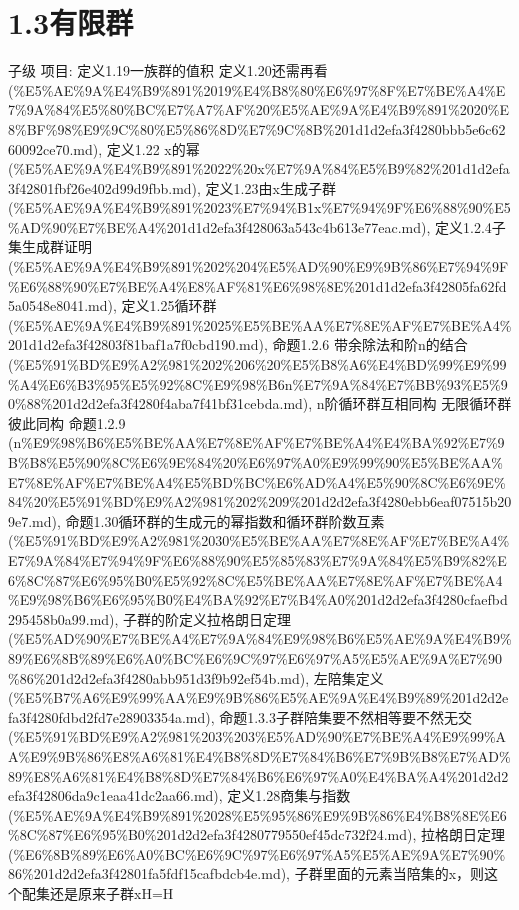 \section*{1.3有限群}

\begin{note}[1.3有限群]

子级 项目: 定义1.19一族群的值积 定义1.20还需再看 (\%E5\%AE\%9A\%E4\%B9\%891\%2019\%E4\%B8\%80\%E6\%97\%8F\%E7\%BE\%A4\%E7\%9A\%84\%E5\%80\%BC\%E7\%A7\%AF\%20\%E5\%AE\%9A\%E4\%B9\%891\%2020\%E8\%BF\%98\%E9\%9C\%80\%E5\%86\%8D\%E7\%9C\%8B\%201d1d2efa3f4280bbb5e6c6260092ce70.md), 定义1.22 x的幂 (\%E5\%AE\%9A\%E4\%B9\%891\%2022\%20x\%E7\%9A\%84\%E5\%B9\%82\%201d1d2efa3f42801fbf26e402d99d9fbb.md), 定义1.23由x生成子群 (\%E5\%AE\%9A\%E4\%B9\%891\%2023\%E7\%94\%B1x\%E7\%94\%9F\%E6\%88\%90\%E5\%AD\%90\%E7\%BE\%A4\%201d1d2efa3f428063a543c4b613e77eac.md), 定义1.2.4子集生成群证明 (\%E5\%AE\%9A\%E4\%B9\%891\%202\%204\%E5\%AD\%90\%E9\%9B\%86\%E7\%94\%9F\%E6\%88\%90\%E7\%BE\%A4\%E8\%AF\%81\%E6\%98\%8E\%201d1d2efa3f42805fa62fd5a0548e8041.md), 定义1.25循环群 (\%E5\%AE\%9A\%E4\%B9\%891\%2025\%E5\%BE\%AA\%E7\%8E\%AF\%E7\%BE\%A4\%201d1d2efa3f42803f81baf1a7f0cbd190.md), 命题1.2.6 带余除法和阶n的结合 (\%E5\%91\%BD\%E9\%A2\%981\%202\%206\%20\%E5\%B8\%A6\%E4\%BD\%99\%E9\%99\%A4\%E6\%B3\%95\%E5\%92\%8C\%E9\%98\%B6n\%E7\%9A\%84\%E7\%BB\%93\%E5\%90\%88\%201d2d2efa3f4280f4aba7f41bf31cebda.md), n阶循环群互相同构 无限循环群彼此同构 命题1.2.9 (n\%E9\%98\%B6\%E5\%BE\%AA\%E7\%8E\%AF\%E7\%BE\%A4\%E4\%BA\%92\%E7\%9B\%B8\%E5\%90\%8C\%E6\%9E\%84\%20\%E6\%97\%A0\%E9\%99\%90\%E5\%BE\%AA\%E7\%8E\%AF\%E7\%BE\%A4\%E5\%BD\%BC\%E6\%AD\%A4\%E5\%90\%8C\%E6\%9E\%84\%20\%E5\%91\%BD\%E9\%A2\%981\%202\%209\%201d2d2efa3f4280ebb6eaf07515b209e7.md), 命题1.30循环群的生成元的幂指数和循环群阶数互素 (\%E5\%91\%BD\%E9\%A2\%981\%2030\%E5\%BE\%AA\%E7\%8E\%AF\%E7\%BE\%A4\%E7\%9A\%84\%E7\%94\%9F\%E6\%88\%90\%E5\%85\%83\%E7\%9A\%84\%E5\%B9\%82\%E6\%8C\%87\%E6\%95\%B0\%E5\%92\%8C\%E5\%BE\%AA\%E7\%8E\%AF\%E7\%BE\%A4\%E9\%98\%B6\%E6\%95\%B0\%E4\%BA\%92\%E7\%B4\%A0\%201d2d2efa3f4280cfaefbd295458b0a99.md), 子群的阶定义拉格朗日定理 (\%E5\%AD\%90\%E7\%BE\%A4\%E7\%9A\%84\%E9\%98\%B6\%E5\%AE\%9A\%E4\%B9\%89\%E6\%8B\%89\%E6\%A0\%BC\%E6\%9C\%97\%E6\%97\%A5\%E5\%AE\%9A\%E7\%90\%86\%201d2d2efa3f4280abb951d3f9b92ef54b.md), 左陪集定义 (\%E5\%B7\%A6\%E9\%99\%AA\%E9\%9B\%86\%E5\%AE\%9A\%E4\%B9\%89\%201d2d2efa3f4280fdbd2fd7e28903354a.md), 命题1.3.3子群陪集要不然相等要不然无交 (\%E5\%91\%BD\%E9\%A2\%981\%203\%203\%E5\%AD\%90\%E7\%BE\%A4\%E9\%99\%AA\%E9\%9B\%86\%E8\%A6\%81\%E4\%B8\%8D\%E7\%84\%B6\%E7\%9B\%B8\%E7\%AD\%89\%E8\%A6\%81\%E4\%B8\%8D\%E7\%84\%B6\%E6\%97\%A0\%E4\%BA\%A4\%201d2d2efa3f42806da9c1eaa41dc2aa66.md), 定义1.28商集与指数 (\%E5\%AE\%9A\%E4\%B9\%891\%2028\%E5\%95\%86\%E9\%9B\%86\%E4\%B8\%8E\%E6\%8C\%87\%E6\%95\%B0\%201d2d2efa3f4280779550ef45dc732f24.md), 拉格朗日定理 (\%E6\%8B\%89\%E6\%A0\%BC\%E6\%9C\%97\%E6\%97\%A5\%E5\%AE\%9A\%E7\%90\%86\%201d2d2efa3f42801fa5fdf15cafbdcb4e.md), 子群里面的元素当陪集的x，则这个配集还是原来子群xH=H 
\end{note}
